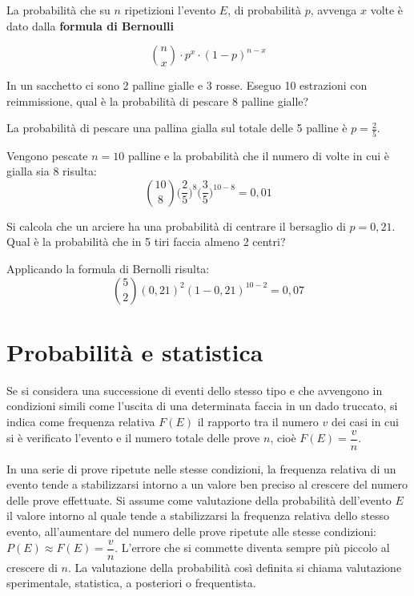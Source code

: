 \begin{definizione}
La probabilità che su \(n\) ripetizioni l'evento \(E\), di probabilità \(p\), 
avvenga \(x\) volte è dato dalla \textbf{formula di Bernoulli}

\[ \binom{n}{x}\cdot p^{x}\cdot(1-p)^{n-x}\]
\end{definizione}

\begin{esempio}
In un sacchetto ci sono 2 palline gialle e 3 rosse. Eseguo 10 estrazioni con 
reimmissione, qual è la probabilità di pescare 8 palline gialle?

La probabilità di pescare una pallina gialla sul totale delle 5 palline è 
\(p=\frac{2}{5}\).

Vengono pescate \(n=10\) palline e la probabilità che il numero di volte in cui 
è gialla sia 8 risulta:
\[ \binom{10}{8} \big(\frac{2}{5}\big)^{8}\big(\frac{3}{5}\big)^{10-8}=0,01\]

\end{esempio}

\begin{esempio}
Si calcola che un arciere ha una probabilità di centrare il bersaglio di 
\(p=0,21\). Qual è la probabilità che in 5 tiri faccia almeno 2 centri?


Applicando la formula di Bernolli risulta:
\[ \binom{5}{2} (0,21)^{2}(1-0,21)^{10-2}=0,07\]

\end{esempio}

\section{Probabilità e statistica}
\label{sec:06_statistica}
Se si considera una successione di eventi dello stesso tipo e che avvengono 
in 
condizioni simili come l'uscita di una determinata faccia in un dado 
truccato, 
si indica come frequenza relativa \(F(E)\) il rapporto tra il numero \(v\) dei 
casi 
in cui si è verificato l'evento e il numero totale delle prove \(n\), cioè 
\(F(E)=\dfrac v n\).

In una serie di prove ripetute nelle stesse condizioni, la frequenza relativa 
di 
un evento tende a stabilizzarsi intorno a un valore ben preciso al crescere 
del 
numero delle prove effettuate.
Si assume come valutazione della probabilità dell'evento \(E\) il valore 
intorno 
al quale tende a stabilizzarsi la frequenza relativa dello stesso evento, 
all'aumentare del numero delle prove ripetute alle stesse condizioni: 
\(P(E)\approx F(E)=\dfrac v n\).
L'errore che si commette diventa sempre più piccolo al crescere di \(n\). La 
valutazione della probabilità così definita si chiama valutazione 
sperimentale, 
statistica, a posteriori o frequentista.

